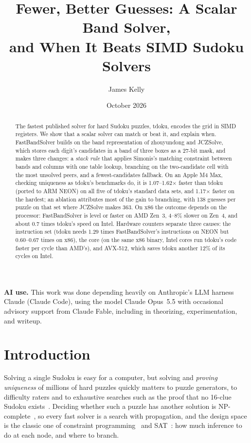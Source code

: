 \documentclass[11pt]{article}
\title{Fewer, Better Guesses: A Scalar Band Solver,\\and When It Beats SIMD Sudoku Solvers}
\author{James Kelly}
\date{October 2026}
\theoremstyle{definition}
\theoremstyle{plain}
\begin{document}
\maketitle

\begin{center}
\begin{minipage}{0.85\textwidth}
\small\textbf{AI use.} This work was done depending heavily on Anthropic's LLM harness Claude (Claude Code), using the model Claude Opus~5.5 with occasional advisory support from Claude Fable, including in theorizing, experimentation, and writeup.
\end{minipage}
\end{center}

\begin{abstract}
The fastest published solver for hard Sudoku puzzles, tdoku, encodes the grid in SIMD registers. We show that a
scalar solver can match or beat it, and explain when. FastBandSolver builds on the band representation of
zhouyundong and JCZSolve, which stores each digit's candidates in a band of three boxes as a 27-bit mask, and makes
three changes: a \emph{stack rule} that applies Simonis's matching constraint between bands and columns with one table
lookup, branching on the two-candidate cell with the most unsolved peers, and a fewest-candidates fallback. On an
Apple M4 Max, checking uniqueness as tdoku's benchmarks do, it is 1.07--1.62$\times$ faster than tdoku (ported to ARM
NEON) on all five of tdoku's standard data sets, and 1.17$\times$ faster on the hardest; an ablation attributes most of
the gain to branching, with 138 guesses per puzzle on that set where JCZSolve makes 363. On x86 the outcome depends on
the processor: FastBandSolver is level or faster on AMD Zen~3, 4--8\% slower on Zen~4, and about 0.7 times tdoku's
speed on Intel. Hardware counters separate three causes: the instruction set (tdoku needs 1.29 times FastBandSolver's
instructions on NEON but 0.60--0.67 times on x86), the core (on the same x86 binary, Intel cores run tdoku's code
faster per cycle than AMD's), and AVX-512, which saves tdoku another 12\% of its cycles on Intel.
\end{abstract}

\section{Introduction}
\label{sec:intro}

Solving a single Sudoku is easy for a computer, but solving and \emph{proving uniqueness} of millions of hard
puzzles quickly matters to puzzle generators, to difficulty raters and to exhaustive searches such as the proof
that no 16-clue Sudoku exists~\cite{mcguire2014sixteen}. Deciding whether such a puzzle has another solution is
NP-complete~\cite{yato2003complexity}, so every fast solver is a search with propagation, and the design space is the
classic one of constraint programming~\cite{simonis2005sudoku} and SAT~\cite{lynce2006sudoku}: how much inference to do
at each node, and where to branch.
\end{document}
